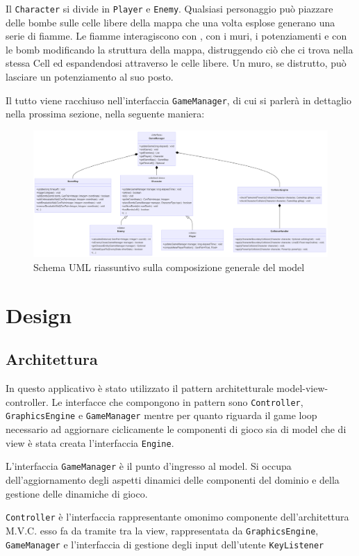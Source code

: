 \documentclass[a4paper,12pt]{report}
\begin{document}
Il \verb|Character| si divide in \verb|Player| e \verb|Enemy|. Qualsiasi personaggio può piazzare delle bombe sulle celle libere della mappa che una volta esplose generano una serie di fiamme. Le fiamme interagiscono con , con i muri, i potenziamenti e con le bomb modificando la struttura della mappa, distruggendo ciò che ci trova nella stessa Cell ed espandendosi attraverso le celle libere. Un muro, se distrutto, può lasciare un potenziamento al suo posto. 

Il tutto viene racchiuso nell'interfaccia \verb|GameManager|, di cui si parlerà in dettaglio nella prossima sezione, nella seguente maniera: 

\begin{figure}[h]
\centering{}
\includegraphics[width=\textwidth]{img/manager-riassunto.png}
\caption{Schema UML riassuntivo sulla composizione generale del model}
\end{figure}

\chapter{Design}

\section{Architettura}

In questo applicativo è stato utilizzato il pattern architetturale model-view-controller. Le interfacce che compongono in pattern sono \verb|Controller|, \verb|GraphicsEngine| e 
\verb|GameManager| mentre per quanto riguarda il game loop necessario ad aggiornare ciclicamente le componenti di gioco sia di model che di view è stata creata l'interfaccia \verb|Engine|.
\par
L'interfaccia \verb|GameManager| è il punto d'ingresso al model. Si occupa dell'aggiornamento degli aspetti dinamici delle componenti del dominio e della gestione delle dinamiche di gioco.
\par
\verb|Controller| è l'interfaccia rappresentante omonimo componente dell'architettura M.V.C. esso fa da tramite tra la view, rappresentata da \verb|GraphicsEngine|, \verb|GameManager| e l'interfaccia di gestione degli input dell'utente \verb|KeyListener| 
\end{document}
